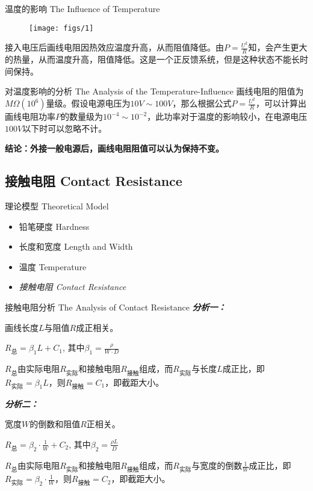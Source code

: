 \documentclass[10pt]{beamer}
\begin{document}
\begin{frame}{温度的影响 The Influence of Temperature }
	\begin{figure}
		\centering
		\texttt{[image: figs/1]}
	\end{figure}
\qquad 接入电压后画线电阻因热效应温度升高，从而阻值降低。由$ P=\frac{U^2}{R} $知，会产生更大的热量，从而温度升高，阻值降低。这是一个正反馈系统，但是这种状态不能长时间保持。
\end{frame}

\begin{frame}{对温度影响的分析 The Analysis of the Temperature-Influence}
\qquad 画线电阻的阻值为$ M\Omega(10^6) $量级。假设电源电压为$ 10V\sim 100V $，那么根据公式$ P=\frac{U^2}{R} $，可以计算出画线电阻功率$ P $的数量级为$ 10^{-4}\sim 10^{-2} $，此功率对于温度的影响较小，在电源电压$ 100V $以下时可以忽略不计。

\bigskip
\pause
{\large \textbf{结论：外接一般电源后，画线电阻阻值可以认为保持不变。}}
\end{frame}
\subsection{接触电阻 Contact Resistance}
\begin{frame}{理论模型 Theoretical Model}
\begin{itemize}
	\item 铅笔硬度 Hardness
	\item 长度和宽度 Length and Width
	\item 温度 Temperature
	\item {\LARGE \textit{接触电阻 Contact Resistance}}
\end{itemize}
\end{frame}

\begin{frame}{接触电阻分析 The Analysis of Contact Resistance }
\textbf{	\textit{分析一：}}
	
	\qquad 画线长度$ L $与阻值$ R $成正相关。
	\begin{theorem}
		\begin{center}
				$R_{\text{总}}=\beta_1L+C_1$, 其中$ \beta_1=\frac{\rho}{W\cdot D} $
		\end{center}
	\end{theorem}
\qquad $ R_{\text{总}} $由实际电阻$ R_{\text{实际}} $和接触电阻$ R_{\text{接触}} $组成，而$ R_{\text{实际}} $与长度$ L $成正比，即$ R_{\text{实际}} =\beta_1L$，则$ R_{\text{接触}} =C_1$，即截距大小。
   \pause
   
   \bigskip
\textbf{	\textit{分析二：}}
	
	\qquad 宽度$ W $的倒数和阻值$ R $正相关。
	\begin{theorem}
		\begin{center}
			$R_{\text{总}}=\beta_2\cdot \frac{1}{W}+C_2$, 其中$ \beta_2=\frac{\rho L}{ D} $
		\end{center}
	\end{theorem}
\qquad $ R_{\text{总}} $由实际电阻$ R_{\text{实际}} $和接触电阻$ R_{\text{接触}} $组成，而$ R_{\text{实际}} $与宽度的倒数$ \frac{1}{W} $成正比，即$ R_{\text{实际}} =\beta_2\cdot \frac{1}{W}$，则$ R_{\text{接触}} =C_2$，即截距大小。
\end{frame}
\end{document}
